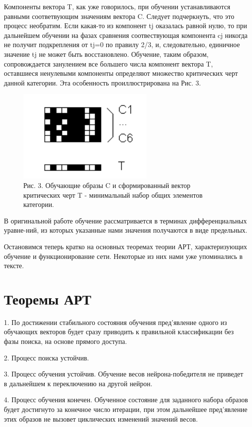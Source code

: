 \documentclass[12pt,a4paper,article]{article}
\begin{document}
Компоненты вектора T, как уже говорилось, при обучении устанавливаются равными соответвующим значениям вектора C. Следует подчеркнуть, что это процесс необратим. Если какая-то из компонент tj оказалась равной нулю, то при дальнейшем обучении на фазах сравнения соотвествующая компонента cj никогда не получит подкрепления от tj=0 по правилу 2/3, и, следовательно, единичное значение tj не может быть восстановлено. Обучение, таким образом, сопровождается занулением все большего числа компонент вектора T, оставшиеся ненулевыми компоненты определяют множество критических черт данной категории. Эта особенность проиллюстрирована на Рис. 3.

\begin{figure}[h!]
	\centering
	\includegraphics[scale = 1.10]{images/3.png}
	\caption{Рис. 3. Обучающие образы C и сформированный вектор критических черт T - минимальный набор общих элементов категории.}
	\label{image:1}
\end{figure}	


В оригинальной работе обучение рассматривается в терминах дифференциальных уравне-ний, из которых указанные нами значения получаются в виде предельных.

Остановимся теперь кратко на основных теоремах теории АРТ, характеризующих обучение и функционирование сети. Некоторые из них нами уже упоминались в тексте.

\section{Теоремы АРТ}
1. По достижении стабильного состояния обучения пред'явление одного из обучающих векторов будет сразу приводить к правильной классификации без фазы поиска, на основе прямого доступа.

2. Процесс поиска устойчив.

3. Процесс обучения устойчив. Обучение весов нейрона-победителя не приведет в дальнейшем к переключению на другой нейрон.

4. Процесс обучения конечен. Обученное состояние для заданного набора образов будет достигнуто за конечное число итерации, при этом дальнейшее пред'явление этих образов не вызовет циклических изменений значений весов.
\end{document}
